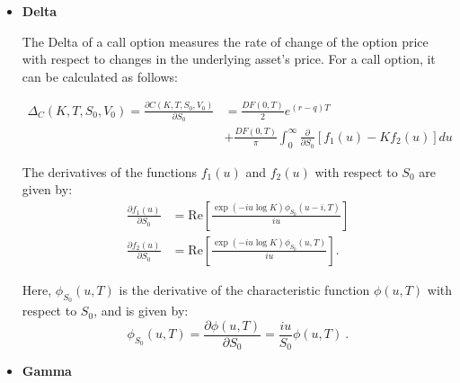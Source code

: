 \begin{itemize}

\item \textbf{Delta} 

The Delta of a call option measures the rate of change of the option price with respect to changes in the underlying asset's price. For a call option, it can be calculated as follows:

$$
\begin{aligned}
\Delta_C(K,T, S_0, V_0) = \frac{ \partial C(K,T, S_0, V_0) }{\partial S_0} &= 
 \frac{DF(0,T)}{2}e^{(r-q) T} \\ &+ \frac{DF(0,T)}{\pi} \int_0^{\infty}\frac{ \partial  }{\partial S_0}  \left[f_1(u) - Kf_2(u)\right]du
\end{aligned}
$$

The derivatives of the functions $f_1(u)$ and $f_2(u)$ with respect to $S_0$ are given by:
\begin{equation}
\label{eq:derivative-s0-f1-f2}
\begin{aligned}
\frac{ \partial  f_1(u)   }{\partial S_0}&= \mathrm{Re}\left[  \frac{\exp(-iu\log K) \phi_{S_0}(u-i,T)   }{iu}\right]   \\  
\frac{\partial f_2(u)   }{\partial S_0} &= \mathrm{Re}\left[ \frac{\exp(-iu\log K) \phi_{S_0}(u,T)  }{iu}\right].
\end{aligned}
\end{equation}

Here, $\phi_{S_0}(u,T)$ is the derivative of the characteristic function $\phi(u,T)$ with respect to $S_0$, and is given by:
$$
\phi_{S_0}(u,T) = \frac{ \partial  \phi(u,T)}{\partial S_0} = \frac{iu}{S_0} \phi(u,T) \ . 
$$


\item \textbf{Gamma} 


\end{itemize}
